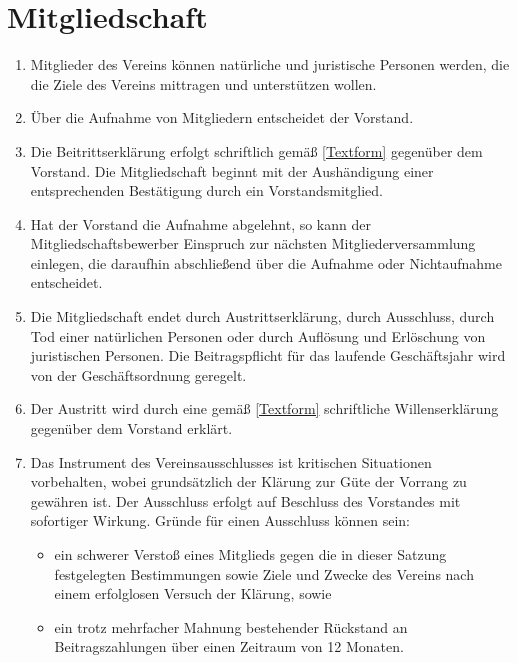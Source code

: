 \documentclass[fontsize=12pt,paper=a4,pagesize,headings=small]{scrartcl}
\begin{document}
\section{Mitgliedschaft}
\begin{enumerate}
    \item Mitglieder des Vereins können natürliche und juristische
    Personen werden, die die Ziele des Vereins mittragen und
    unterstützen wollen.

    \item Über die Aufnahme von Mitgliedern entscheidet der Vorstand.

    \item Die Beitrittserklärung erfolgt schriftlich gemäß
    \ref{Textform} gegenüber dem Vorstand. Die Mitgliedschaft
    beginnt mit der Aushändigung einer entsprechenden Bestätigung durch
    ein Vorstandsmitglied.

    \item Hat der Vorstand die Aufnahme abgelehnt, so kann der
    Mitgliedschaftsbewerber Einspruch zur nächsten
    Mitgliederversammlung einlegen, die daraufhin abschließend über die
    Aufnahme oder Nichtaufnahme entscheidet.

    \item Die Mitgliedschaft endet durch Austrittserklärung, durch
    Ausschluss, durch Tod einer natürlichen Personen oder durch
    Auflösung und Erlöschung von juristischen Personen. Die
    Beitragspflicht für das laufende Geschäftsjahr wird von der
    Geschäftsordnung geregelt.

    \item Der Austritt wird durch eine gemäß \ref{Textform}
    schriftliche Willenserklärung gegenüber dem Vorstand erklärt.

    \item Das Instrument des Vereinsausschlusses ist kritischen
    Situationen vorbehalten, wobei grundsätzlich der Klärung zur Güte
    der Vorrang zu gewähren ist. Der Ausschluss erfolgt auf Beschluss
    des Vorstandes mit sofortiger Wirkung. Gründe für einen Ausschluss
    können sein:
        \begin{itemize}
            \item ein schwerer Verstoß eines Mitglieds gegen die in
            dieser Satzung festgelegten Bestimmungen sowie Ziele und
            Zwecke des Vereins nach einem erfolglosen Versuch der
            Klärung, sowie
            \item ein trotz mehrfacher Mahnung bestehender Rückstand an
            Beitragszahlungen über einen Zeitraum von 12 Monaten.
        \end{itemize}


\end{enumerate}
\end{document}
